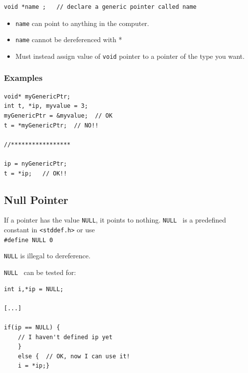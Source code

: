 \begin{verbatim}
void *name ;   // declare a generic pointer called name
\end{verbatim}

\begin{itemize}
        \item {\tt name} can point to anything in the computer.
        \item {\tt name} cannot be dereferenced with *
        \item Must instead assign value of {\tt void}
        pointer  to a pointer of the type you want. \\
\end{itemize}



\subsubsection*{Examples}
\begin{verbatim}
void* myGenericPtr;
int t, *ip, myvalue = 3;
myGenericPtr = &myvalue;  // OK
t = *myGenericPtr;  // NO!!

//*****************

ip = nyGenericPtr;
t = *ip;   // OK!!
\end{verbatim}




\subsection{Null Pointer}

If a pointer has the value {\tt NULL}, it points
to nothing.   {\tt NULL } is a predefined constant
in {\tt <stddef.h>} or use\\
{\tt \#define NULL 0}

{\tt NULL} is illegal to dereference.

{\tt NULL } can be tested for:

\begin{verbatim}
int i,*ip = NULL;

[...]

if(ip == NULL) {
    // I haven't defined ip yet
    }
    else {  // OK, now I can use it!
    i = *ip;}
\end{verbatim}

